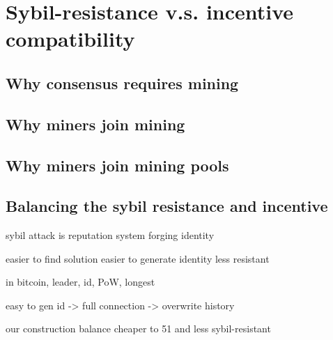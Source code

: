 \section{Sybil-resistance v.s. incentive compatibility}

\subsection{Why consensus requires mining}



\subsection{Why miners join mining}




\subsection{Why miners join mining pools}



\subsection{Balancing the sybil resistance and incentive}



sybil attack is 
reputation system
forging identity

easier to find solution
easier to generate identity
less resistant

in bitcoin, leader, id, PoW, longest

easy to gen id -> full connection -> overwrite history


our construction
balance
cheaper to 51 and less sybil-resistant



